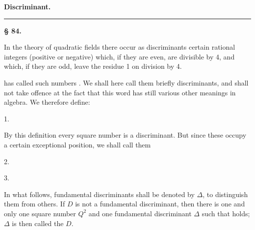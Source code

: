 
\begin{center}

\textbf{\Large Discriminant.}

\rule{0.3\linewidth}{0.4pt}
\end{center}

\begin{center}
\textbf{§ 84. }
\end{center}

In the theory of quadratic fields there occur as discriminants certain rational integers (positive or negative) which, if they are even, are divisible by 4, and which, if they are odd, leave the residue 1 on division by 4.

 has called such numbers \glqq {}\grqq{}. We shall here call them briefly discriminants, and shall not take offence at the fact that this word has still various other meanings in algebra. We therefore define:

1. 

By this definition every square number is a discriminant. But since these occupy a certain exceptional position, we shall call them 

2. 

3. 

In what follows, fundamental discriminants shall be denoted by $\Delta$, to distinguish them from others. If $D$ is not a fundamental discriminant, then there is one and only one square number $Q^2$ and one fundamental discriminant $\Delta$ such that
holds; $\Delta$ is then called the  $D$.
